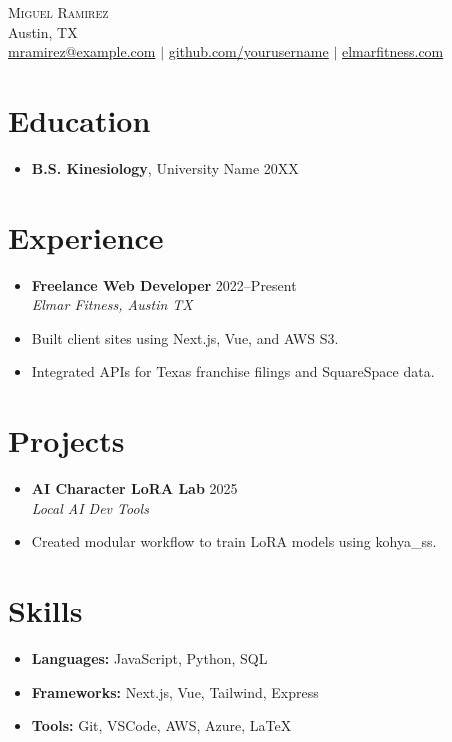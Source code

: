\documentclass[letterpaper,10pt]{article}
\newcommand{\resumeItem}[1]{\item\small{#1}}
\newcommand{\resumeSubheading}[4]{
  \vspace{-1pt}\item
    \textbf{#1} \hfill #2 \\
    \textit{\small#3} \hfill \textit{\small #4}
}
\begin{document}
\begin{center}
  {\Huge \scshape Miguel Ramirez} \\ \vspace{1pt}
  Austin, TX \\ 
  \href{mailto:mramirez@example.com}{mramirez@example.com} $|$
  \href{https://github.com/yourusername}{github.com/yourusername} $|$
  \href{https://elmarfitness.com}{elmarfitness.com}
\end{center}

\section*{Education}
\begin{itemize}[leftmargin=0.15in]
  \item[]
    \textbf{B.S. Kinesiology}, University Name \hfill 20XX
\end{itemize}

\section*{Experience}
\begin{itemize}[leftmargin=0.15in]
  \resumeSubheading
    {Freelance Web Developer}{2022–Present}
    {Elmar Fitness, Austin TX}{}
    \resumeItem{Built client sites using Next.js, Vue, and AWS S3.}
    \resumeItem{Integrated APIs for Texas franchise filings and SquareSpace data.}
\end{itemize}

\section*{Projects}
\begin{itemize}[leftmargin=0.15in]
  \resumeSubheading
    {AI Character LoRA Lab}{2025}
    {Local AI Dev Tools}{}
    \resumeItem{Created modular workflow to train LoRA models using kohya_ss.}
\end{itemize}

\section*{Skills}
\begin{itemize}[leftmargin=0.15in, label={}]
  \item \textbf{Languages:} JavaScript, Python, SQL
  \item \textbf{Frameworks:} Next.js, Vue, Tailwind, Express
  \item \textbf{Tools:} Git, VSCode, AWS, Azure, LaTeX
\end{itemize}
\end{document}
